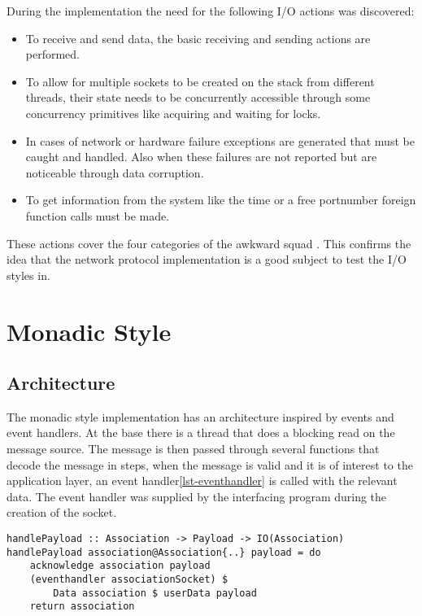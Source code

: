 During the implementation the need for the following I/O actions was discovered:

\begin{itemize}

\item To receive and send data, the basic receiving and sending actions are performed.

\item To allow for multiple sockets to be created on the stack from different threads, their state needs to be concurrently accessible through some concurrency primitives like acquiring and waiting for locks.

\item In cases of network or hardware failure exceptions are generated that must be caught and handled. Also when these failures are not reported but are noticeable through data corruption.

\item To get information from the system like the time or a free portnumber foreign function calls must be made.
\end{itemize}

These actions cover the four categories of the awkward squad \cite{jones_tackling_2009}. 
This confirms the idea that the network protocol implementation is a good subject to test the I/O styles in.
\section{Monadic Style}
\subsection{Architecture}
The monadic style implementation has an architecture inspired by events and event handlers. At the base there is a thread that does a blocking read on the message source. The message is then passed through several functions that decode the message in steps, when the message is valid and it is of interest to the application layer, an event handler\ref{lst-eventhandler} is called with the relevant data. The event handler was supplied by the interfacing program during the creation of the socket.

\begin{lstlisting}[caption={The eventhandler is called when a payload is received},label={lst-eventhandler}]
handlePayload :: Association -> Payload -> IO(Association)
handlePayload association@Association{..} payload = do 
    acknowledge association payload
    (eventhandler associationSocket) $
	    Data association $ userData payload
    return association
\end{lstlisting}

